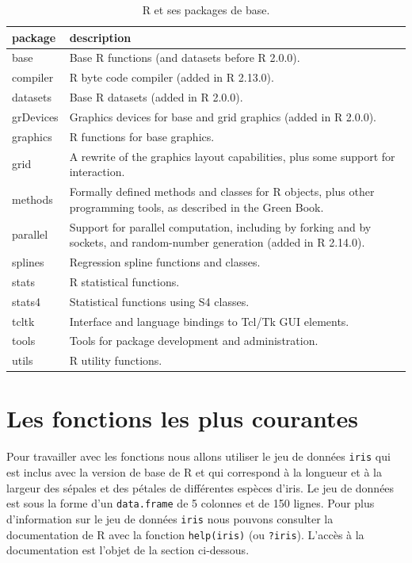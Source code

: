 \documentclass[
]{book}
\begin{document}
\begin{table}

\caption{\label{tab:tabPkg}R et ses packages de base.\label{tab:tabPkg}}
\centering
\begin{tabular}[t]{l|l}
\hline
package & description\\
\hline
base & Base R functions (and datasets before R 2.0.0).\\
\hline
compiler & R byte code compiler (added in R 2.13.0).\\
\hline
datasets & Base R datasets (added in R 2.0.0).\\
\hline
grDevices & Graphics devices for base and grid graphics (added in R 2.0.0).\\
\hline
graphics & R functions for base graphics.\\
\hline
grid & A rewrite of the graphics layout capabilities, plus some support for interaction.\\
\hline
methods & Formally defined methods and classes for R objects, plus other programming tools, as described in the Green Book.\\
\hline
parallel & Support for parallel computation, including by forking and by sockets, and random-number generation (added in R 2.14.0).\\
\hline
splines & Regression spline functions and classes.\\
\hline
stats & R statistical functions.\\
\hline
stats4 & Statistical functions using S4 classes.\\
\hline
tcltk & Interface and language bindings to Tcl/Tk GUI elements.\\
\hline
tools & Tools for package development and administration.\\
\hline
utils & R utility functions.\\
\hline
\end{tabular}
\end{table}

\hypertarget{l015mainfun}{%
\section{Les fonctions les plus courantes}\label{l015mainfun}}

Pour travailler avec les fonctions nous allons utiliser le jeu de données \texttt{iris} qui est inclus avec la version de base de R et qui correspond à la longueur et à la largeur des sépales et des pétales de différentes espèces d'iris. Le jeu de données est sous la forme d'un \texttt{data.frame} de 5 colonnes et de 150 lignes. Pour plus d'information sur le jeu de données \texttt{iris} nous pouvons consulter la documentation de R avec la fonction \texttt{help(iris)} (ou \texttt{?iris}). L'accès à la documentation est l'objet de la section ci-dessous.
\end{document}
